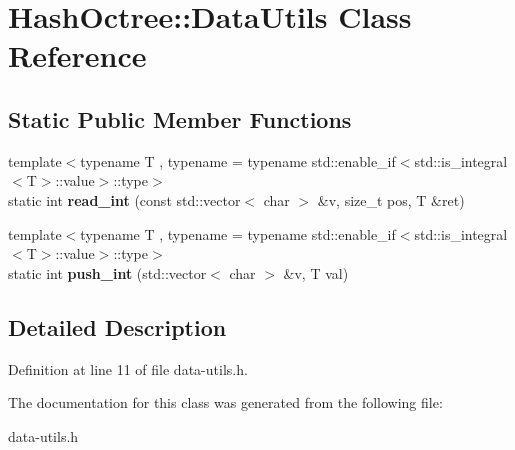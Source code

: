 \hypertarget{class_hash_octree_1_1_data_utils}{}\section{Hash\+Octree\+::Data\+Utils Class Reference}
\label{class_hash_octree_1_1_data_utils}
\subsection*{Static Public Member Functions}
\begin{DoxyCompactItemize}
\item 
\mbox{\label{class_hash_octree_1_1_data_utils_a77f66d23f50e240c3556b69149c297ec}} 
{\footnotesize template$<$typename T , typename  = typename std\+::enable\+\_\+if$<$std\+::is\+\_\+integral$<$\+T$>$\+::value$>$\+::type$>$ }\\static int {\bfseries read\+\_\+int} (const std\+::vector$<$ char $>$ \&v, size\+\_\+t pos, T \&ret)
\item 
\mbox{\label{class_hash_octree_1_1_data_utils_a2f5a79c2b9a52a82f3afbee15b3e8dd8}} 
{\footnotesize template$<$typename T , typename  = typename std\+::enable\+\_\+if$<$std\+::is\+\_\+integral$<$\+T$>$\+::value$>$\+::type$>$ }\\static int {\bfseries push\+\_\+int} (std\+::vector$<$ char $>$ \&v, T val)
\end{DoxyCompactItemize}


\subsection{Detailed Description}


Definition at line 11 of file data-\/utils.\+h.



The documentation for this class was generated from the following file\+:\begin{DoxyCompactItemize}
\item 
data-\/utils.\+h\end{DoxyCompactItemize}
